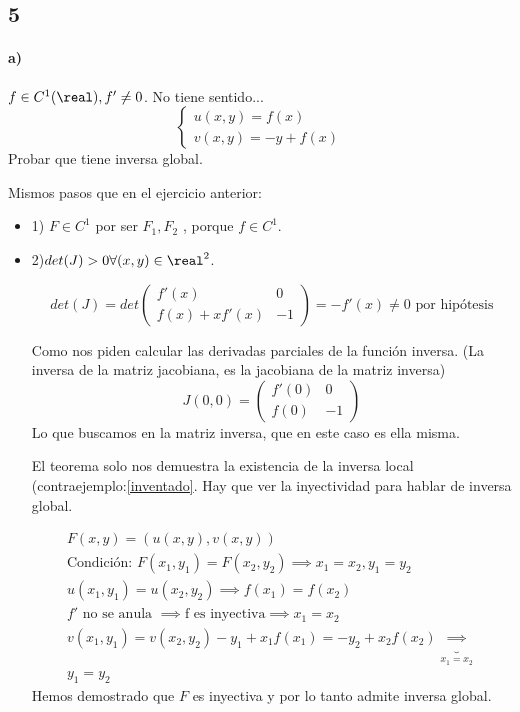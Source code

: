 \documentclass{apuntes}
\begin{document}
 \subsection{5}
 \paragraph{a)}
 $f\in C^1(\real), f'\neq0$.
 No tiene sentido...
 $$\left\{\begin{matrix} u(x,y) =f(x)\\v(x,y) = -y + f(x)\end{matrix}\right.$$
 Probar que tiene inversa global.
 
 Mismos pasos que en el ejercicio anterior:
 \begin{itemize}
 \item 1) $F \in C^1$ por ser $F_1,F_2$ , porque $f\in C^1$.
 \item 2)$det(J)>0 \forall (x,y)\in \real^2$.
 
 $$det(J) = det\begin{pmatrix} f'(x)&0\\f(x)+xf'(x)&-1\end{pmatrix} = -f'(x) \neq 0\text{ por hipótesis}$$
 
 Como nos piden calcular las derivadas parciales de la función inversa. (La inversa de la matriz jacobiana, es la jacobiana de la matriz inversa)
 $$J(0,0) = \begin{pmatrix}f'(0) & 0 \\f(0) & -1\end{pmatrix}$$
 Lo que buscamos en la matriz inversa, que en este caso es ella misma.
 
 El teorema solo nos demuestra la existencia de la inversa local (contraejemplo:\ref{inventado}. Hay que ver la inyectividad para hablar de inversa global.
 
\begin{gather*}
F(x,y) = (u(x,y),v(x,y))\\
\text{Condición: }F(x_1,y_1) = F(x_2,y_2) \implies x_1=x_2, y_1=y_2\\
u(x_1,y_1) = u(x_2,y_2) \implies f(x_1) = f(x_2)\\
f' \text{ no se anula } \implies \text{f es inyectiva} \implies x_1=x_2\\
v(x_1,y_1) = v(x_2,y_2) -y_1 + x_1f(x_1) = -y_2 + x_2f(x_2) \underbrace{\implies}_{x_1=x_2}\\
y_1=y_2
\end{gather*}
Hemos demostrado que $F$ es inyectiva y por lo tanto admite inversa global.
 
\end{itemize}
\end{document}
